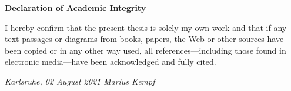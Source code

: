 {\Large \textbf{Declaration of Academic Integrity}} 

\bigskip
I hereby confirm that the present thesis is solely my own work and that if any text passages or diagrams from books, papers, the Web or
other sources have been copied or in any other way used, all references---including those found in
electronic media---have been acknowledged and fully cited. \\



\vspace{1cm}
 
\textit{Karlsruhe, 02 August 2021} \hspace{4cm} \textit{Marius Kempf} \\
